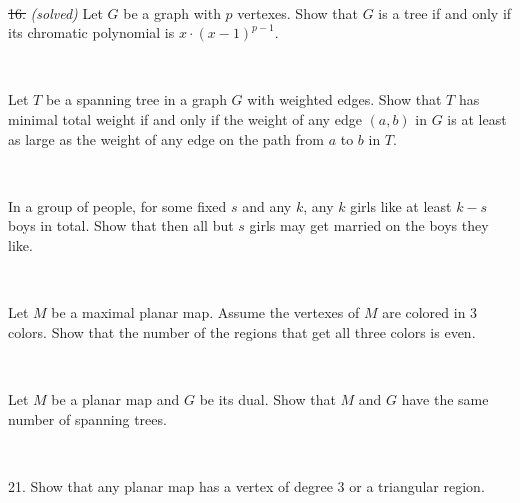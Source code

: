 \documentclass[oneside,a4paper]{article}
\begin{document}
\ 

\noindent \sout{16.} \textit{(solved)}
Let $G$ be a graph with $p$ vertexes.
Show that  $G$ is a tree if and only if
its chromatic polynomial is $x\cdot(x-1)^{p-1}$.

\ 

 Let $T$ be a spanning tree in a graph $G$ with weighted edges.
Show that $T$ has minimal total weight if and only if the weight of any edge $(a,b)$ in $G$ is at least as large as the weight of any edge on the path from $a$ to $b$ in $T$. 


\ 

 In a group of people, for some fixed $s$ and any $k$,
any $k$ girls like at least $k-s$ boys in total.
Show that then all but $s$ girls may get married on the boys they like.

\ 

Let $M$ be a maximal planar map.
Assume the vertexes of $M$ are colored in 3 colors.
Show that the number of the regions that get all three colors is even.

\ 

Let $M$ be a planar map and $G$ be its dual.
Show that $M$ and $G$ have the same number of spanning trees.

\ 

\noindent %
{21.} %
Show that any planar map has a vertex of degree 3 or a triangular region.
\end{document}
